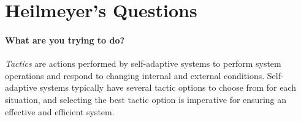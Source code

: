 \documentclass[12pt]{article}
\begin{document}




\vspace{-5mm}
\section{Heilmeyer’s Questions} %

\vspace{-1mm}\paragraph{What are you trying to do?}\emph{Tactics} are actions performed by self-adaptive systems to perform system operations and respond to changing internal and external conditions. Self-adaptive systems typically have several tactic options to choose from for each situation, and selecting the best tactic option is imperative for ensuring an effective and efficient system. 
\end{document}
